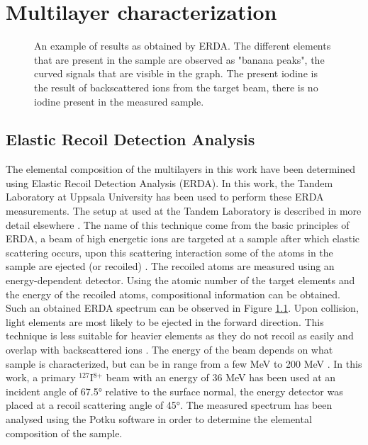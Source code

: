 \chapter{Multilayer characterization}\label{multilayercharacterization}
\begin{figure}
	\centering
\def\svgwidth{\textwidth}

\caption{An example of results as obtained by ERDA. The different elements that are present in the sample are observed as "banana peaks", the curved signals that are visible in the graph. The present iodine is the result of backscattered ions from the target beam, there is no iodine present in the measured sample.}
\label{ERDA}
\end{figure}
\section{Elastic Recoil Detection Analysis}
The elemental composition of the multilayers in this work have been determined using Elastic Recoil Detection Analysis (ERDA). In this work, the Tandem Laboratory at Uppsala University has been used to perform these ERDA measurements. The setup at used at the Tandem Laboratory is described in more detail elsewhere \cite{ERDA_UU}. The name of this technique come from the basic principles of ERDA, a beam of high energetic ions are targeted at a sample after which elastic scattering occurs, upon this scattering interaction some of the atoms in the sample are ejected (or recoiled) \cite{ERDA_0}. The recoiled atoms are measured using an energy-dependent detector. Using the atomic number of the target elements and the energy of the recoiled atoms, compositional information can be obtained. Such an obtained ERDA spectrum can be observed in Figure \ref{ERDA}. Upon collision, light elements are most likely to be ejected in the forward direction. This technique is less suitable for heavier elements as they do not recoil as easily and overlap with backscattered ions \cite{thesis_naureen}. The energy of the beam depends on what sample is characterized, but can be in range from a few MeV to 200 MeV \cite{ERDA_1}. In this work, a primary $^{\text{127}}$I$^{\text{8+}}$ beam with an energy of 36 MeV has been used at an incident angle of 67.5° relative to the surface normal, the energy detector was placed at a recoil scattering angle of 45°. The measured spectrum has been analysed using the Potku software \cite{potku} in order to determine the elemental composition of the sample. 
